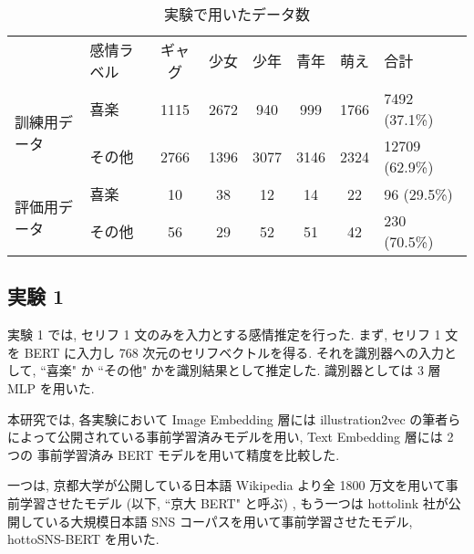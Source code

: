 \begin{table}[!ht]
\begin{center}
\caption{実験で用いたデータ数} %
\label{table:data_exp} %
\begin{tabular}{llccccc|l}
\hline
\multirow{2}{*}{}       & \multirow{2}{*}{感情ラベル} & \multirow{2}{*}{ギャグ} & \multirow{2}{*}{少女} & \multirow{2}{*}{少年} & \multirow{2}{*}{青年} & \multirow{2}{*}{萌え} & \multirow{2}{*}{合計} \\
                        &                        &                      &                     &                     &                     &                     &                     \\ \hline
\multirow{2}{*}{訓練用データ} & 喜楽                     & 1115                 & 2672                & 940                 & 999                 & 1766                & 7492 (37.1\%)       \\
                        & その他                    & 2766                 & 1396                & 3077                & 3146                & 2324                & 12709 (62.9\%)      \\ \hline
\multirow{2}{*}{評価用データ} & 喜楽                     & 10                   & 38                  & 12                  & 14                  & 22                  & 96 (29.5\%)         \\
                        & その他                    & 56                   & 29                  & 52                  & 51                  & 42                  & 230 (70.5\%)
\end{tabular}
\end{center}
\end{table}


\changeindent{0cm}
\subsection{実験 1}
\changeindent{2cm}

実験 1 では, セリフ 1 文のみを入力とする感情推定を行った.
まず, セリフ 1 文を BERT に入力し 768 次元のセリフベクトルを得る.
それを識別器への入力として, ``喜楽" か ``その他" かを識別結果として推定した.
識別器としては 3 層 MLP を用いた.

本研究では, 各実験において Image Embedding 層には illustration2vec の筆者らによって公開されている事前学習済みモデルを用い, Text Embedding 層には 2 つの 事前学習済み BERT モデルを用いて精度を比較した.

\newpage

一つは, 京都大学が公開している日本語 Wikipedia より全 1800 万文を用いて事前学習させたモデル \cite{kyoto-bert} (以下, ``京大 BERT" と呼ぶ) , もう一つは hottolink 社が公開している大規模日本語 SNS コーパスを用いて事前学習させたモデル, hottoSNS-BERT \cite{hottoSNS-bert} を用いた.
